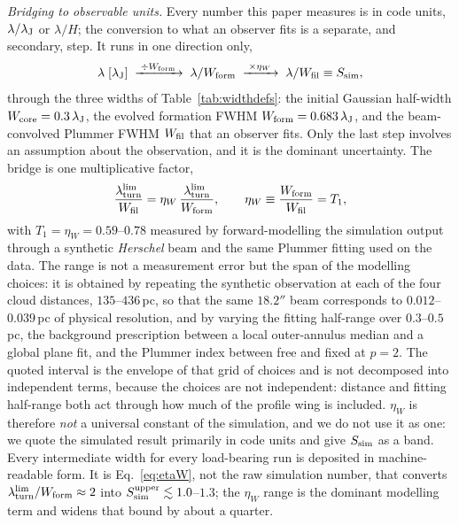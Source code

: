 \documentclass[usenatbib,twoside,twocolumn]{mnras}
\begin{document}
\emph{Bridging to observable units.} Every number this paper measures is in code units, $\lambda/\lambda_{\rm J}$ or $\lambda/H$; the conversion to what an observer fits is a separate, and secondary, step. It runs in one direction only,
\begin{equation*}
\lambda\;[\lambda_{\rm J}]\;\xrightarrow{\;\div W_{\rm form}\;}\;\lambda/W_{\rm form}\;\xrightarrow{\;\times\eta_W\;}\;\lambda/W_{\rm fil}\equiv S_{\rm sim},
\end{equation*}
through the three widths of Table~\ref{tab:widthdefs}: the initial Gaussian half-width $W_{\rm core}=0.3\,\lambda_{\rm J}$, the evolved formation FWHM $W_{\rm form}=0.683\,\lambda_{\rm J}$, and the beam-convolved Plummer FWHM $W_{\rm fil}$ that an observer fits. Only the last step involves an assumption about the observation, and it is the dominant uncertainty. The bridge is one multiplicative factor,
\begin{equation}
\frac{\lambda_{\rm turn}^{\rm lim}}{W_{\rm fil}}=\eta_W\,\frac{\lambda_{\rm turn}^{\rm lim}}{W_{\rm form}},
\qquad \eta_W\equiv\frac{W_{\rm form}}{W_{\rm fil}}=T_1,
\label{eq:etaW}
\end{equation}
with $T_1=\eta_W=0.59$--$0.78$ measured by forward-modelling the simulation output through a synthetic \textit{Herschel} beam and the same Plummer fitting used on the data. The range is not a measurement error but the span of the modelling choices: it is obtained by repeating the synthetic observation at each of the four cloud distances, $135$--$436$\,pc, so that the same $18.2''$ beam corresponds to $0.012$--$0.039$\,pc of physical resolution, and by varying the fitting half-range over $0.3$--$0.5$\,pc, the background prescription between a local outer-annulus median and a global plane fit, and the Plummer index between free and fixed at $p=2$. The quoted interval is the envelope of that grid of choices and is not decomposed into independent terms, because the choices are not independent: distance and fitting half-range both act through how much of the profile wing is included. $\eta_W$ is therefore \emph{not} a universal constant of the simulation, and we do not use it as one: we quote the simulated result primarily in code units and give $S_{\rm sim}$ as a band. Every intermediate width for every load-bearing run is deposited in machine-readable form. It is Eq.~\ref{eq:etaW}, not the raw simulation number, that converts $\lambda_{\rm turn}^{\rm lim}/W_{\rm form}\approx2$ into $S_{\rm sim}^{\rm upper}\lesssim1.0$--$1.3$; the $\eta_W$ range is the dominant modelling term and widens that bound by about a quarter.
\end{document}

